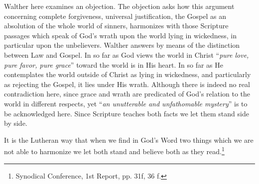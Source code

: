                 Walther here examines an objection.  The objection asks how this argument concerning complete forgiveness, universal justification, the Gospel as an absolution of the whole world of sinners, harmonizes with those Scripture passages which speak of God’s wrath upon the world lying in wickedness, in particular upon the unbelievers.  Walther answers by means of the distinction between Law and Gospel.  In so far as God views the world in Christ “\textit{pure love, pure favor, pure grace}” toward the world is in His heart.  In so far as He contemplates the world outside of Christ as lying in wickedness, and particularly as rejecting the Gospel, it lies under His wrath.  Although there is indeed no real contradiction here, since grace and wrath are predicated of God’s relation to the world in different respects, yet “\textit{an unutterable and unfathomable mystery}” is to be acknowledged here.  Since Scripture teaches both facts we let them stand side by side.  \begin{fancyquotes}It is the Lutheran way that when we find in God’s Word two things which we are not able to harmonize we let both stand and believe both as they read.\footnote{Synodical Conference, 1st Report, pp. 31f, 36 f.}\end{fancyquotes}